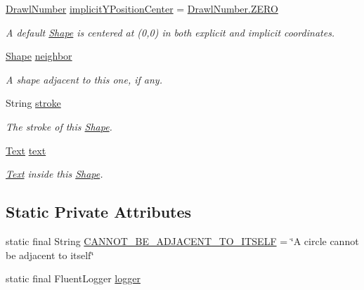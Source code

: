 \begin{DoxyCompactItemize}
\hyperlink{classcom_1_1aarrelaakso_1_1drawl_1_1_drawl_number}{Drawl\+Number} \hyperlink{classcom_1_1aarrelaakso_1_1drawl_1_1_shape_a10c3fb121211c5f33b65d9bed7a44a9f}{implicit\+Y\+Position\+Center} = \hyperlink{classcom_1_1aarrelaakso_1_1drawl_1_1_drawl_number_a14c9ceff1fb3f2bd5c3b380183db933a}{Drawl\+Number.\+Z\+E\+RO}
\begin{DoxyCompactList}\small\item\em A default \hyperlink{classcom_1_1aarrelaakso_1_1drawl_1_1_shape}{Shape} is centered at (0,0) in both explicit and implicit coordinates. \end{DoxyCompactList}\item 
\hyperlink{classcom_1_1aarrelaakso_1_1drawl_1_1_shape}{Shape} \hyperlink{classcom_1_1aarrelaakso_1_1drawl_1_1_shape_a57da030925a9bfc11bc49333b63a2e0f}{neighbor}
\begin{DoxyCompactList}\small\item\em A shape adjacent to this one, if any. \end{DoxyCompactList}\item 
String \hyperlink{classcom_1_1aarrelaakso_1_1drawl_1_1_shape_a7889c6cd8d073a3adad5ce6bcf8247a3}{stroke}
\begin{DoxyCompactList}\small\item\em The stroke of this \hyperlink{classcom_1_1aarrelaakso_1_1drawl_1_1_shape}{Shape}. \end{DoxyCompactList}\item 
\hyperlink{classcom_1_1aarrelaakso_1_1drawl_1_1_text}{Text} \hyperlink{classcom_1_1aarrelaakso_1_1drawl_1_1_shape_ab54afc2d95d3447532f5ecf3fec3faa8}{text}
\begin{DoxyCompactList}\small\item\em \hyperlink{classcom_1_1aarrelaakso_1_1drawl_1_1_text}{Text} inside this \hyperlink{classcom_1_1aarrelaakso_1_1drawl_1_1_shape}{Shape}. \end{DoxyCompactList}\end{DoxyCompactItemize}
\subsection*{Static Private Attributes}
\begin{DoxyCompactItemize}
\item 
static final String \hyperlink{classcom_1_1aarrelaakso_1_1drawl_1_1_shape_a82d5613ad2795e107346a68e48ae8379}{C\+A\+N\+N\+O\+T\+\_\+\+B\+E\+\_\+\+A\+D\+J\+A\+C\+E\+N\+T\+\_\+\+T\+O\+\_\+\+I\+T\+S\+E\+LF} = \char`\"{}A circle cannot be adjacent to itself\char`\"{}
\item 
static final Fluent\+Logger \hyperlink{classcom_1_1aarrelaakso_1_1drawl_1_1_shape_ab9ce64789a45acc1bdd2cee046264ff6}{logger}
\end{DoxyCompactItemize}


